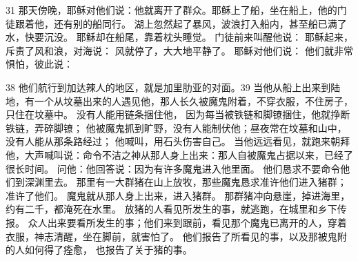 31 那天傍晚，耶稣对他们说：他就离开了群众。耶稣上了船，坐在船上，他的门徒跟着他，还有别的船同行。 湖上忽然起了暴风，波浪打入船内，甚至船已满了水，快要沉没。 耶稣却在船尾，靠着枕头睡觉。 门徒前来叫醒他说： 耶稣起来，斥责了风和浪，对海说： 风就停了，大大地平静了。 耶稣对他们说： 他们就非常惧怕，彼此说：\par

38  他们航行到加达辣人的地区，就是加里肋亚的对面。39  当他从船上出来到陆地，有一个从坟墓出来的人遇见他，那人长久被魔鬼附着，不穿衣服，不住房子，只住在坟墓中。 没有人能用链条捆住他， 因为每当被铁链和脚镣捆住，他就挣断铁链，弄碎脚镣； 他被魔鬼抓到旷野，没有人能制伏他；昼夜常在坟墓和山中， 没有人能从那条路经过； 他喊叫，用石头伤害自己。 当他远远看见，就跑来朝拜他，大声喊叫说：命令不洁之神从那人身上出来：那人自被魔鬼占据以来，已经了很长时间。 问他：他回答说：因为有许多魔鬼进入他里面。 他们恳求不要命令他们到深渊里去。 那里有一大群猪在山上放牧，那些魔鬼恳求准许他们进入猪群；准许了他们。 魔鬼就从那人身上出来，进入猪群。 那群猪冲向悬崖，掉进海里，约有二千，都淹死在水里。 放猪的人看见所发生的事，就逃跑，在城里和乡下传报。 众人出来要看所发生的事；他们来到跟前，看见那个魔鬼已离开的人，穿着衣服，神志清醒，坐在脚前，就害怕了。 他们报告了所看见的事，以及那被鬼附的人如何得了痊愈， 也报告了关于猪的事。\par



\section{}

